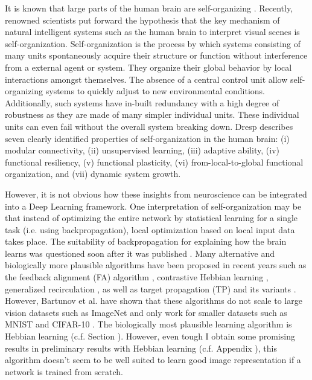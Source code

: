 It is known that large parts of the human brain are self-organizing .
Recently, renowned scientists  put forward the hypothesis that the key mechanism of natural intelligent systems such as the human brain to interpret visual scenes is self-organization.
Self-organization is the process by which systems consisting of many units spontaneously acquire their structure or function without interference from a external agent or system.
They organize their global behavior by local interactions amongst themselves.
The absence of a central control unit allow self-organizing systems to quickly adjust to new environmental conditions.
Additionally, such systems have in-built redundancy with a high degree of robustness as they  are made of many simpler individual units.
These individual units can even fail without the overall system breaking down.
Dresp  describes seven clearly identified properties of self-organization in the human brain: (i) modular connectivity, (ii) unsupervised learning, (iii) adaptive ability, (iv) functional resiliency, (v) functional plasticity, (vi) from-local-to-global functional organization, and (vii) dynamic system growth.

However, it is not obvious how these insights from neuroscience can be integrated into a Deep Learning framework.
One interpretation of self-organization may be that instead of optimizing the entire network by statistical learning for a single task (i.e. using backpropagation), local optimization based on local input data takes place.
The suitability of backpropagation for explaining how the brain learns was questioned soon after it was published .
Many alternative and biologically more plausible algorithms have been proposed in recent years such as the feedback alignment (FA) algorithm , contrastive Hebbian learning , generalized recirculation , as well as target propagation (TP) and its variants .
However, Bartunov et al.  have shown that these algorithms do not scale to large vision datasets such as ImageNet \cite{deng2009imagenet} and only work for smaller datasets such as MNIST \cite{MNIST} and CIFAR-10 \cite{cifar_10}.
The biologically most plausible learning algorithm is Hebbian learning (c.f. Section ).
However, even tough I obtain some promising results in preliminary results with Hebbian learning (c.f. Appendix ), this algorithm doesn't seem to be well suited to learn good image representation if a network is trained from scratch.

